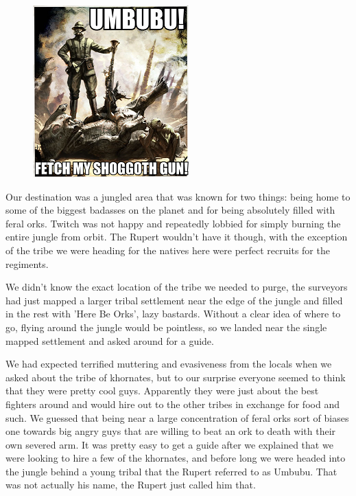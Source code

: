 \begin{figure}
	\begin{center}
		\includegraphics[width=\figwidth]{pics/6/29.png}
	\end{center}
\end{figure}
Our destination was a jungled area that was known for two things: being home to some of the biggest badasses on the planet and for being absolutely filled with feral orks. 
Twitch was not happy and repeatedly lobbied for simply burning the entire jungle from orbit. 
The Rupert wouldn't have it though, with the exception of the tribe we were heading for the natives here were perfect recruits for the regiments.

We didn't know the exact location of the tribe we needed to purge, the surveyors had just mapped a larger tribal settlement near the edge of the jungle and filled in the rest with 'Here Be Orks', lazy bastards. 
Without a clear idea of where to go, flying around the jungle would be pointless, so we landed near the single mapped settlement and asked around for a guide. 

We had expected terrified muttering and evasiveness from the locals when we asked about the tribe of khornates, but to our surprise everyone seemed to think that they were pretty cool guys. 
Apparently they were just about the best fighters around and would hire out to the other tribes in exchange for food and such. 
We guessed that being near a large concentration of feral orks sort of biases one towards big angry guys that are willing to beat an ork to death with their own severed arm. 
It was pretty easy to get a guide after we explained that we were looking to hire a few of the khornates, and before long we were headed into the jungle behind a young tribal that the Rupert referred to as Umbubu. 
That was not actually his name, the Rupert just called him that.

